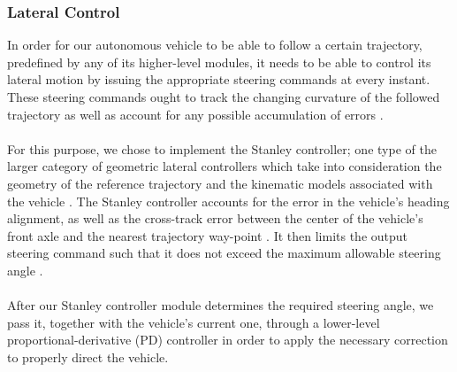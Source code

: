 \subsubsection{Lateral Control}
\label{specs_lat_ctrl}
In order for our autonomous vehicle to be able to follow a certain trajectory, predefined by any of its higher-level modules, it needs to be able to control its lateral motion by issuing the appropriate steering commands at every instant. These steering commands ought to track the changing curvature of the followed trajectory as well as account for any possible accumulation of errors \cite{Hoffmann07autonomousautomobile}. 
\\ \\
For this purpose, we chose to implement the Stanley controller; one type of the larger category of geometric lateral controllers which take into consideration the geometry of the reference trajectory and the kinematic models associated with the vehicle \cite{article}. The Stanley controller accounts for the error in the vehicle’s heading alignment, as well as the cross-track error between the center of the vehicle’s front axle and the nearest trajectory way-point \cite{article}.  It then limits the output steering command such that it does not exceed the maximum allowable steering angle \cite{Hoffmann07autonomousautomobile}.
\\ \\
After our Stanley controller module determines the required steering angle, we pass it, together with the vehicle’s current one, through a lower-level proportional-derivative (PD) controller in order to apply the necessary correction to properly direct the vehicle.

